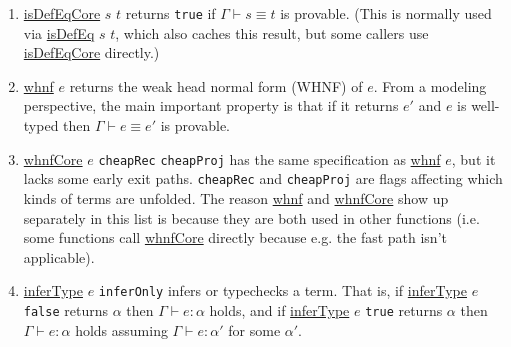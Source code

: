 \documentclass[sigplan,10pt,screen]{acmart}\settopmatter{printfolios=true,printccs=false,printacmref=false}
\newcommand{\code}[1]{\mbox{\ttfamily\small #1}}
\begin{document}
\begin{enumerate}
  \item \href{https://github.com/digama0/lean4lean/blob/cpp2026/Lean4Lean/TypeChecker.lean#L665}{\code{isDefEqCore}} $s$ $t$ returns \lstinline|true| if $\Gamma\vdash s\equiv t$ is provable. (This is normally used via \href{https://github.com/digama0/lean4lean/blob/cpp2026/Lean4Lean/TypeChecker.lean#L145}{\code{isDefEq}} $s$ $t$, which also caches this result, but some callers use \href{https://github.com/digama0/lean4lean/blob/cpp2026/Lean4Lean/TypeChecker.lean#L665}{\code{isDefEqCore}} directly.)
  \item \href{https://github.com/digama0/lean4lean/blob/cpp2026/Lean4Lean/TypeChecker.lean#L435}{\code{whnf}} $e$ returns the weak head normal form (WHNF) of $e$. From a modeling perspective, the main important property is that if it returns $e'$ and $e$ is well-typed then $\Gamma\vdash e\equiv e'$ is provable.
  \item \href{https://github.com/digama0/lean4lean/blob/cpp2026/Lean4Lean/TypeChecker.lean#L310}{\code{whnfCore}} $e$ \lstinline|cheapRec| \lstinline|cheapProj| has the same specification as \href{https://github.com/digama0/lean4lean/blob/cpp2026/Lean4Lean/TypeChecker.lean#L435}{\code{whnf}} $e$, but it lacks some early exit paths. \lstinline|cheapRec| and \lstinline|cheapProj| are flags affecting which kinds of terms are unfolded. The reason \href{https://github.com/digama0/lean4lean/blob/cpp2026/Lean4Lean/TypeChecker.lean#L435}{\code{whnf}} and \href{https://github.com/digama0/lean4lean/blob/cpp2026/Lean4Lean/TypeChecker.lean\#L310}{\code{whnfCore}} show up separately in this list is because they are both used in other functions (i.e. some functions call \href{https://github.com/digama0/lean4lean/blob/cpp2026/Lean4Lean/TypeChecker.lean#L310}{\code{whnfCore}} directly because e.g. the fast path isn't applicable).
  \item \href{https://github.com/digama0/lean4lean/blob/cpp2026/Lean4Lean/TypeChecker.lean#L240}{\code{inferType}} $e$ \lstinline|inferOnly| infers or typechecks a term. That is, if \href{https://github.com/digama0/lean4lean/blob/cpp2026/Lean4Lean/TypeChecker.lean#L240}{\code{inferType}} $e$ \lstinline|false| returns $\alpha$ then $\Gamma\vdash e:\alpha$ holds, and if \href{https://github.com/digama0/lean4lean/blob/cpp2026/Lean4Lean/TypeChecker.lean#L240}{\code{inferType}} $e$ \lstinline|true| returns $\alpha$ then $\Gamma\vdash e:\alpha$ holds assuming $\Gamma\vdash e:\alpha'$ for some $\alpha'$.
\end{enumerate}
\end{document}
